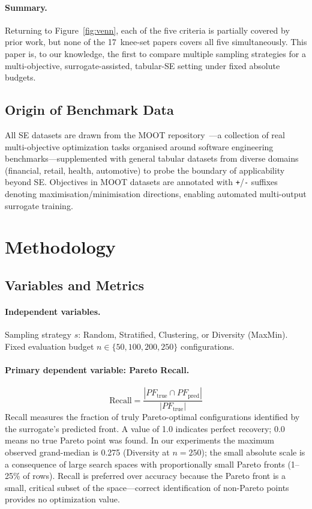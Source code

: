 \documentclass[sigconf,nonacm]{acmart}
\begin{document}
\paragraph{Summary.}
Returning to Figure~\ref{fig:venn}, each of the five criteria is partially
covered by prior work, but none of the 17~knee-set papers covers all five
simultaneously.
This paper is, to our knowledge, the first to compare multiple sampling
strategies for a multi-objective, surrogate-assisted, tabular-SE setting
under fixed absolute budgets.

\subsection{Origin of Benchmark Data}

All SE datasets are drawn from the MOOT repository~\cite{moot2025}---a
collection of real multi-objective optimization tasks organised around
software engineering benchmarks---supplemented with general tabular datasets
from diverse domains (financial, retail, health, automotive) to probe the
boundary of applicability beyond SE.
Objectives in MOOT datasets are annotated with \texttt{+}/\texttt{-} suffixes
denoting maximisation/minimisation directions, enabling automated multi-output
surrogate training.

\section{Methodology}
\label{sec:methods}

\subsection{Variables and Metrics}
\label{sec:variables}

\paragraph{Independent variables.}
Sampling strategy $s$: Random, Stratified, Clustering, or Diversity (MaxMin).
Fixed evaluation budget $n \in \{50, 100, 200, 250\}$ configurations.

\paragraph{Primary dependent variable: Pareto Recall.}
\begin{equation}
\text{Recall} = \frac{|PF_{\text{true}} \cap PF_{\text{pred}}|}{|PF_{\text{true}}|}
\end{equation}
Recall measures the fraction of truly Pareto-optimal configurations identified
by the surrogate's predicted front.
A value of 1.0 indicates perfect recovery; 0.0 means no true Pareto point
was found.
In our experiments the maximum observed grand-median is 0.275
(Diversity at $n=250$); the small absolute scale is a consequence of large
search spaces with proportionally small Pareto fronts (1--25\% of rows).
Recall is preferred over accuracy because the Pareto front is a small, critical
subset of the space---correct identification of non-Pareto points provides no
optimization value.
\end{document}
